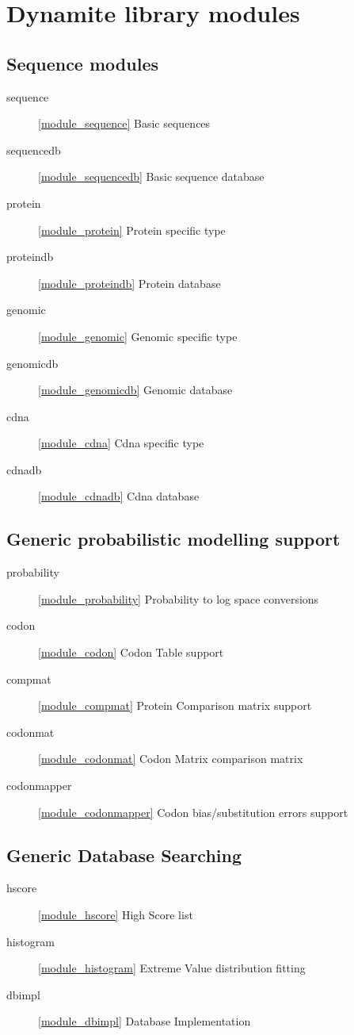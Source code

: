 \section{Dynamite library modules}

\subsection{Sequence modules}
\begin{description}
\item[sequence] \ref{module_sequence} Basic sequences
\item[sequencedb] \ref{module_sequencedb} Basic sequence database
\item[protein] \ref{module_protein} Protein specific type
\item[proteindb] \ref{module_proteindb} Protein database
\item[genomic] \ref{module_genomic} Genomic specific type
\item[genomicdb] \ref{module_genomicdb} Genomic database
\item[cdna] \ref{module_cdna} Cdna specific type
\item[cdnadb] \ref{module_cdnadb} Cdna database
\end{description}

\subsection{Generic probabilistic modelling support}

\begin{description}
\item[probability] \ref{module_probability} Probability to log space conversions
\item[codon] \ref{module_codon} Codon Table support
\item[compmat] \ref{module_compmat} Protein Comparison matrix support
\item[codonmat] \ref{module_codonmat} Codon Matrix comparison matrix
\item[codonmapper] \ref{module_codonmapper} Codon bias/substitution errors support
\end{description}

\subsection{Generic Database Searching}

\begin{description}
\item[hscore] \ref{module_hscore} High Score list
\item[histogram] \ref{module_histogram} Extreme Value distribution fitting 
\item[dbimpl] \ref{module_dbimpl} Database Implementation 
\end{description}

